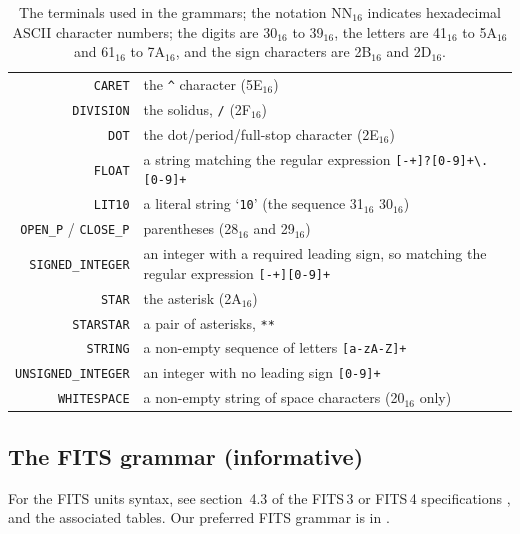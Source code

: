 \documentclass[11pt,a4paper]{ivoa}
\newcommand*\hex[1]{\uppercase{#1}${}_{16}$}
\begin{document}
\begin{table}[ht]
\begin{tabular}{rL{8.5cm}}
\texttt{CARET}&the \texttt{\^{}} character (\hex{5e})\\
\texttt{DIVISION}&the solidus, \texttt{/} (\hex{2f})\\
\texttt{DOT}&the dot/period/full-stop character (\hex{2e})\\
\texttt{FLOAT}&a string matching the regular expression
       \texttt{[-+]?[0-9]+\textbackslash.[0-9]+}\\
\texttt{LIT10}&a literal string `\texttt{10}' (the sequence \hex{31} \hex{30})\\
\texttt{OPEN\_P} / \texttt{CLOSE\_P}&parentheses (\hex{28} and \hex{29})\\
\texttt{SIGNED\_INTEGER}&an integer with a required leading sign, so
matching the regular expression \texttt{[-+][0-9]+}\\
\texttt{STAR}&the asterisk (\hex{2a})\\
\texttt{STARSTAR}&a pair of asterisks, \texttt{**}\\
\texttt{STRING}&a non-empty sequence of letters \texttt{[a-zA-Z]+}\\
\texttt{UNSIGNED\_INTEGER}&an integer with no leading sign \texttt{[0-9]+}\\
\texttt{WHITESPACE}&a non-empty string of space characters (\hex{20} only)\\
\end{tabular}
\caption[The terminals used in the grammars]
{\label{tabx:terminals}The terminals used in the grammars; the
notation \hex{nn} indicates hexadecimal ASCII character numbers;
the digits are \hex{30} to \hex{39}, the letters are \hex{41} to \hex{5a} and \hex{61} to
\hex{7a}, and the sign characters are \hex{2b} and \hex{2d}.}
\end{table}

\subsection{The FITS grammar (informative)}
\label{appx:fitsgrammar}

For the FITS units syntax, see section~4.3 of the FITS\,3
or FITS\,4 specifications \citep{pence10,fits4}, and the
associated tables.  Our preferred FITS grammar is in
.
\end{document}
